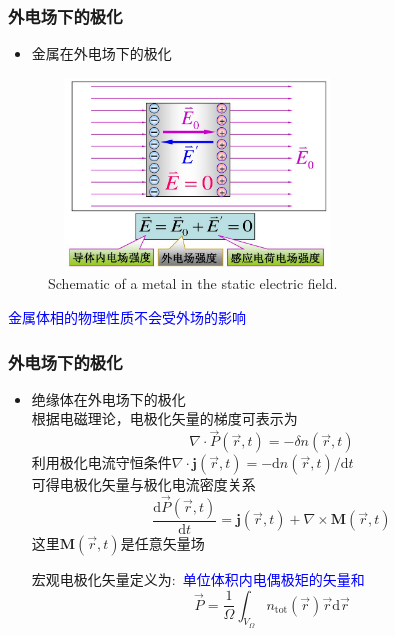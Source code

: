 {\frame
{
	\frametitle{外电场下的极化}
	\begin{itemize}
		\item 金属在外电场下的极化
	\end{itemize}
\begin{figure}[h!]
\centering
\vspace*{-0.15in}
\includegraphics[height=2.0in,width=3.1in,viewport=0 0 900 650,clip]{Figures/Polarize_metal-2.png}
\caption{\tiny \textrm{Schematic of a metal in the static electric field.}}%
\label{Polarization_metal}
\end{figure} 
\textcolor{blue}{金属体相的物理性质不会受外场的影响}
}

\frame
{
	\frametitle{外电场下的极化}
	\begin{itemize}
		\item 绝缘体在外电场下的极化\\
			根据电磁理论，电极化矢量的梯度可表示为
			\begin{displaymath}
				\nabla\cdot\vec P(\vec r,t)=-\delta n(\vec r,t)
			\end{displaymath}
			利用极化电流守恒条件$\nabla\cdot\mathbf{j}(\vec r,t)=-\mathrm{d}n(\vec r,t)/\mathrm{d}t$\\
			可得电极化矢量与极化电流密度关系
			\begin{displaymath}
				\frac{\mathrm{d}\vec P(\vec r,t)}{\mathrm{d}t}=\mathbf{j}(\vec r,t)+\nabla\times\mathbf{M}(\vec r,t)
			\end{displaymath}
			这里$\mathbf{M}(\vec r,t)$是任意矢量场

			宏观电极化矢量定义为:~\textcolor{blue}{单位体积内电偶极矩的矢量和}
\begin{displaymath}
	\vec P=\dfrac1{\Omega}\int_{V_{\Omega}}n_{\mathrm{tot}}(\vec r)\vec r\mathrm{d}\vec r
\end{displaymath}
	\end{itemize}
}

}

